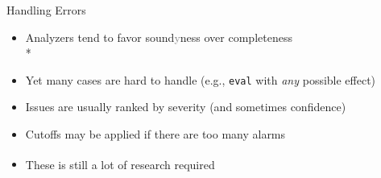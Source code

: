 \documentclass[
   aspectratio=169, %
   10pt, %
   uniqueslidenumber,
   professionalfonts
]{beamer}
\def\sbseries{\fontseries{sb}\selectfont}
\def\textsb#1{{\sbseries#1}}
\begin{document}
\begin{frame}{Handling Errors}
   \begin{itemize}
      \itemsep8pt
      \item<2-> Analyzers tend to \textsb{favor sound\textcolor{gray}{y}ness over completeness}\\*
      \item<4-> Yet many cases are hard to handle (e.g., \texttt{eval} with \textit{any} possible effect)
      \item<5-> Issues are usually ranked by severity (and sometimes confidence)
      \item<6-> Cutoffs may be applied if there are too many alarms
      \item<7-> These is still a lot of research required\,\textsuperscript{\smaller[2]\cite[p.\,705]{DBLP:journals/entcs/EmanuelssonN08,cousout2021principles}}
   \end{itemize}
\end{frame}
\end{document}
